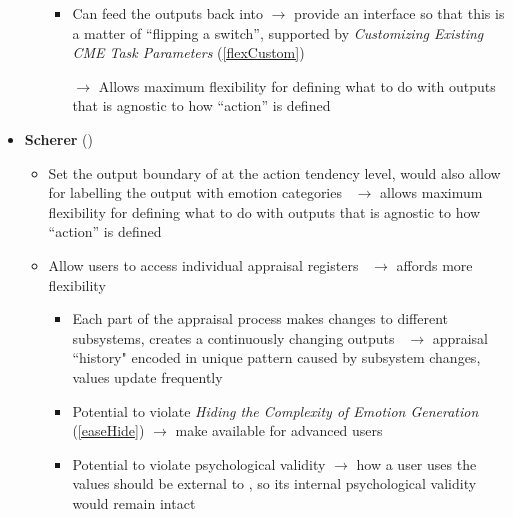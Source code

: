 \begin{itemize}
\begin{itemize}
\begin{itemize}
            \item Can feed the outputs back into \progname{} $\rightarrow$
            provide an interface so that this is a matter of ``flipping a
            switch'', supported by \textit{Customizing Existing CME Task
                Parameters} (\ref{flexCustom})

            \item [$\rightarrow$] Allows maximum flexibility for defining what
            to do with outputs that is agnostic to how ``action'' is defined
        \end{itemize}
    \end{itemize}

    \item \textbf{Scherer} (\strong)
    \begin{itemize}
        \item Set the output boundary of \progname{} at the action tendency
        level, would also allow for labelling the output with emotion
        categories~\citep[p.~107, 113]{scherer2001appraisalB} $\rightarrow$
        allows maximum flexibility for defining what to do with outputs that is
        agnostic to how ``action'' is defined

        \item Allow users to access individual appraisal
        registers~\citep[p.~104]{scherer2001appraisalB} $\rightarrow$ affords
        more flexibility
        \begin{itemize}
            \item Each part of the appraisal process makes changes to different
            subsystems, creates a continuously changing
            outputs~\citep[p.~107]{scherer2001appraisalB} $\rightarrow$
            appraisal ``history" encoded in unique pattern caused by subsystem
            changes, values update frequently

            \item Potential to violate \textit{Hiding the Complexity of Emotion
                Generation} (\ref{easeHide}) $\rightarrow$ make available for
            advanced users

            \item Potential to violate psychological validity $\rightarrow$ how
            a user uses the values should be external to \progname{}, so its
            internal psychological validity would remain intact
        \end{itemize}
    \end{itemize}


\end{itemize}
